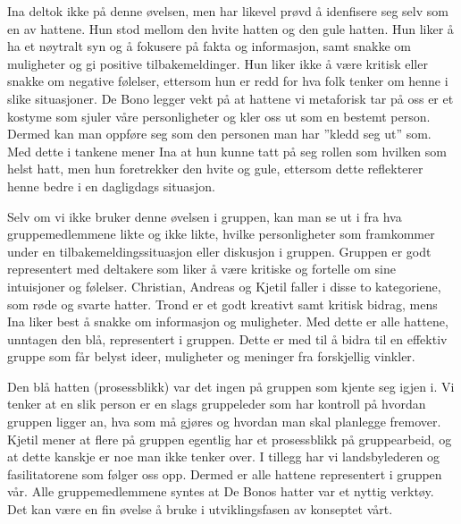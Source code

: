 Ina deltok ikke på denne øvelsen, men har likevel prøvd å idenfisere seg selv som en av hattene. Hun stod mellom den hvite hatten og den gule hatten. Hun liker å ha et nøytralt syn og å fokusere på fakta og informasjon, samt snakke om muligheter og gi positive tilbakemeldinger. Hun liker ikke å være kritisk eller snakke om negative følelser, ettersom hun er redd for hva folk tenker om henne i slike situasjoner. De Bono legger vekt på at hattene vi metaforisk tar på oss er et kostyme som sjuler våre personligheter og kler oss ut som en bestemt person. Dermed kan man oppføre seg som den personen man har ''kledd seg ut'' som. Med dette i tankene mener Ina at hun kunne tatt på seg rollen som hvilken som helst hatt, men hun foretrekker den hvite og gule, ettersom dette reflekterer henne bedre i en dagligdags situasjon.

Selv om vi ikke bruker denne øvelsen i gruppen, kan man se ut i fra hva gruppemedlemmene likte og ikke likte, hvilke personligheter som framkommer under en tilbakemeldingssituasjon eller diskusjon i gruppen. Gruppen er godt representert med deltakere som liker å være kritiske og fortelle om sine intuisjoner og følelser. Christian, Andreas og Kjetil faller i disse to kategoriene, som røde og svarte hatter. Trond er et godt kreativt samt kritisk bidrag, mens Ina liker best å snakke om informasjon og muligheter. Med dette er alle hattene, unntagen den blå, representert i gruppen. Dette er med til å bidra til en effektiv gruppe som får belyst ideer, muligheter og meninger fra forskjellig vinkler. 

Den blå hatten (prosessblikk) var det ingen på gruppen som kjente seg igjen i. Vi tenker at en slik person er en slags gruppeleder som har kontroll på hvordan gruppen ligger an, hva som må gjøres og hvordan man skal planlegge fremover. Kjetil mener at flere på gruppen egentlig har et prosessblikk på gruppearbeid, og at dette kanskje er noe man ikke tenker over. I tillegg har vi landsbylederen og fasilitatorene som følger oss opp. Dermed er alle hattene representert i gruppen vår.
Alle gruppemedlemmene syntes at De Bonos hatter var et nyttig verktøy. Det kan være en fin øvelse å bruke i utviklingsfasen av konseptet vårt. 


